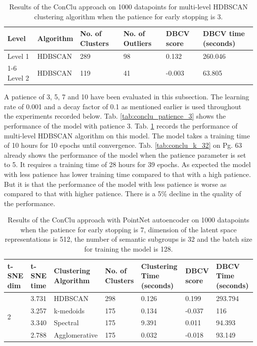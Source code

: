 \begin{table}[H]
  \setlength\extrarowheight{10pt}
  \caption{Results of the ConClu approach on 1000 datapoints for multi-level \ac{HDBSCAN} clustering algorithm when the patience for early stopping is 3. }
  \centering
  \begin{tabular}{|l|l|l|l|l|l|}
    \toprule
    Level & Algorithm	& No. of Clusters	& No. of Outliers	& DBCV score	& \ac{DBCV} time (seconds)	\\  
    \midrule
    Level 1 & \ac{HDBSCAN} & 289	& 98	& 0.132	& 260.046 \\ \cline{1-6}
    Level 2 & \ac{HDBSCAN} & 119	& 41	& -0.003	& 63.805 \\ 
    \bottomrule
  \end{tabular}
  \label{tab:conclu_patience_3_levels}
\end{table}
A patience of 3, 5, 7 and 10 have been evaluated in this subsection. The learning rate of 0.001 and a decay factor of 0.1 as mentioned earlier is used throughout the experiments recorded below. Tab. \ref{tab:conclu_patience_3} shows the performance of the model with patience 3. Tab. \ref{tab:conclu_patience_3_levels} records the performance of multi-level \ac{HDBSCAN} algorithm on this model. The model takes a training time of 10 hours for 10 epochs until convergence. Tab. \ref{tab:conclu_k_32} on Pg. 63 already shows the performance of the model when the patience parameter is set to 5. It requires a training time of 28 hours for 39 epochs. As expected the model with less patience has lower training time compared to that with a high patience. But it is that the performance of the model with less patience is worse as compared to that with higher patience. There is a 5\% decline in the quality of the performance. 

\begin{table}[H]
  \setlength\extrarowheight{10pt}
  \caption{Results of the ConClu approach with PointNet autoencoder on 1000 datapoints when the patience for early stopping is 7, dimension of the latent space representations is 512, the number of semantic subgroups is 32 and the batch size for training the model is 128. }
  \centering
  \begin{tabular}{|p{30pt}|p{50pt}|p{60pt}|p{50pt}|p{50pt}|p{50pt}|p{40pt}|}
    \toprule
    \ac{t-SNE} dim	& \ac{t-SNE} time & Clustering Algorithm & No. of Clusters & Clustering Time (seconds) & \ac{DBCV} score & \ac{DBCV} Time (seconds)\\
    \midrule
    \multirow{4}{30pt}{2}	& 3.731	& \ac{HDBSCAN}	& 298	& 0.126	& 0.199	& 293.794
    \\ \cline{2-7} 
    & 3.257	& k-medoids	& 175	& 0.134	& -0.037	& 116 \\ \cline{2-7} 
    & 3.340	& Spectral	& 175	& 9.391	& 0.011	& 94.393 \\ \cline{2-7}
    & 2.788	& Agglomerative	& 175	& 0.032	& -0.018	& 93.149 \\ 
    \bottomrule
  \end{tabular}
  \label{tab:conclu_patience_7}
\end{table}

